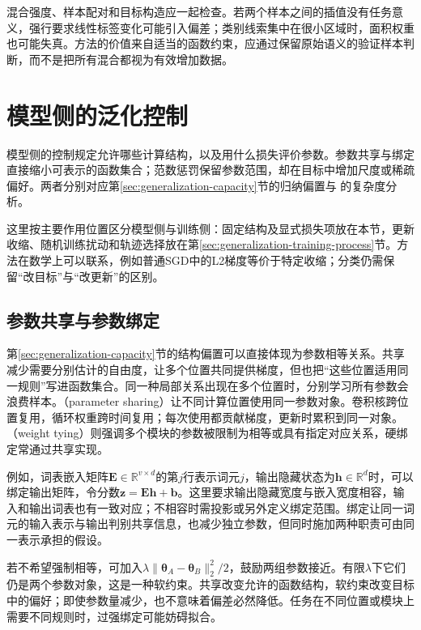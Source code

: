 混合强度、样本配对和目标构造应一起检查。若两个样本之间的插值没有任务意义，强行要求线性标签变化可能引入偏差；类别线索集中在很小区域时，面积权重也可能失真。方法的价值来自适当的函数约束，应通过保留原始语义的验证样本判断，而不是把所有混合都视为有效增加数据。

\section{模型侧的泛化控制}
\label{sec:generalization-constraints}

模型侧的控制规定允许哪些计算结构，以及用什么损失评价参数。参数共享与绑定直接缩小可表示的函数集合；范数惩罚保留参数范围，却在目标中增加尺度或稀疏偏好。两者分别对应第\ref{sec:generalization-capacity}节的归纳偏置与
的复杂度分析。

这里按主要作用位置区分模型侧与训练侧：固定结构及显式损失项放在本节，更新收缩、随机训练扰动和轨迹选择放在第\ref{sec:generalization-training-process}节。方法在数学上可以联系，例如普通SGD中的L2梯度等价于特定收缩；分类仍需保留“改目标”与“改更新”的区别。

\subsection{参数共享与参数绑定}
\label{sec:generalization-parameter-sharing}

第\ref{sec:generalization-capacity}节的结构偏置可以直接体现为参数相等关系。共享减少需要分别估计的自由度，让多个位置共同提供梯度，但也把“这些位置适用同一规则”写进函数集合。同一种局部关系出现在多个位置时，分别学习所有参数会浪费样本。（parameter sharing）让不同计算位置使用同一参数对象。卷积核跨位置复用，循环权重跨时间复用；每次使用都贡献梯度，更新时累积到同一对象。（weight tying）则强调多个模块的参数被限制为相等或具有指定对应关系，硬绑定常通过共享实现。

例如，词表嵌入矩阵$\bm E\in\mathbb R^{v\times d}$的第$j$行表示词元$j$，输出隐藏状态为$\bm h\in\mathbb R^d$时，可以绑定输出矩阵，令分数$\bm z=\bm E\bm h+\bm b$。这里要求输出隐藏宽度与嵌入宽度相容，输入和输出词表也有一致对应；不相容时需投影或另外定义绑定范围。绑定让同一词元的输入表示与输出判别共享信息，也减少独立参数，但同时施加两种职责可由同一表示承担的假设。

若不希望强制相等，可加入$\lambda\lVert\bm\theta_A-\bm\theta_B\rVert_2^2/2$，鼓励两组参数接近。有限$\lambda$下它们仍是两个参数对象，这是一种软约束。共享改变允许的函数结构，软约束改变目标中的偏好；即使参数量减少，也不意味着偏差必然降低。任务在不同位置或模块上需要不同规则时，过强绑定可能妨碍拟合。

